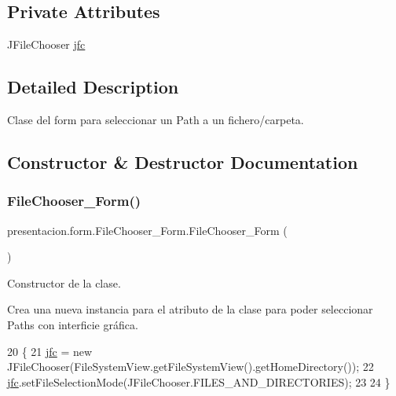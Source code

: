 \subsection*{Private Attributes}
\begin{DoxyCompactItemize}
\item 
J\+File\+Chooser \hyperlink{classpresentacion_1_1form_1_1FileChooser__Form_a6fc55a912c266f0379aab09209dd858c}{jfc}
\end{DoxyCompactItemize}


\subsection{Detailed Description}
Clase del form para seleccionar un Path a un fichero/carpeta. 

\subsection{Constructor \& Destructor Documentation}
\mbox{\label{classpresentacion_1_1form_1_1FileChooser__Form_abcd4d671f55d23cf9e0f2488a80b62cb}} 
\subsubsection{\texorpdfstring{File\+Chooser\+\_\+\+Form()}{FileChooser\_Form()}}
{\footnotesize\ttfamily presentacion.\+form.\+File\+Chooser\+\_\+\+Form.\+File\+Chooser\+\_\+\+Form (\begin{DoxyParamCaption}{ }\end{DoxyParamCaption})\hspace{0.3cm}{\ttfamily [inline]}}



Constructor de la clase. 

Crea una nueva instancia para el atributo de la clase para poder seleccionar Path\textquotesingle{}s con interficie gráfica. 
\begin{DoxyCode}
20                               \{
21         \hyperlink{classpresentacion_1_1form_1_1FileChooser__Form_a6fc55a912c266f0379aab09209dd858c}{jfc} = \textcolor{keyword}{new} JFileChooser(FileSystemView.getFileSystemView().getHomeDirectory());
22         \hyperlink{classpresentacion_1_1form_1_1FileChooser__Form_a6fc55a912c266f0379aab09209dd858c}{jfc}.setFileSelectionMode(JFileChooser.FILES\_AND\_DIRECTORIES);
23 
24     \}
\end{DoxyCode}


